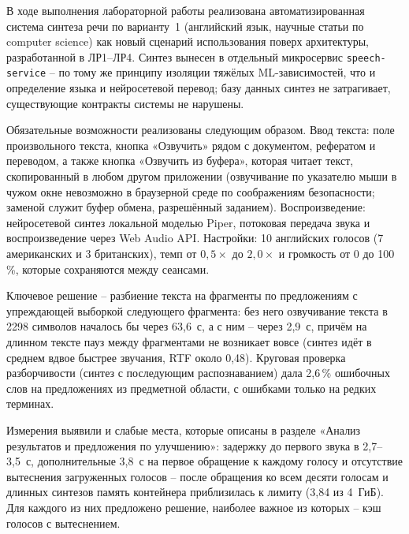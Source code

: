 

В ходе выполнения лабораторной работы реализована автоматизированная
система синтеза речи по варианту~1 (английский язык, научные статьи по
computer science) как новый сценарий использования поверх архитектуры,
разработанной в ЛР1--ЛР4. Синтез вынесен в отдельный микросервис
\texttt{speech-service} -- по тому же принципу изоляции тяжёлых
ML-зависимостей, что и определение языка и нейросетевой перевод; базу
данных синтез не затрагивает, существующие контракты системы не
нарушены.

Обязательные возможности реализованы следующим образом. Ввод текста:
поле произвольного текста, кнопка «Озвучить» рядом с документом,
рефератом и переводом, а также кнопка «Озвучить из буфера», которая
читает текст, скопированный в любом другом приложении (озвучивание по
указателю мыши в чужом окне невозможно в браузерной среде по
соображениям безопасности; заменой служит буфер обмена, разрешённый
заданием). Воспроизведение: нейросетевой синтез локальной моделью
Piper, потоковая передача звука и воспроизведение через Web Audio API.
Настройки: 10 английских голосов (7 американских и 3 британских),
темп от $0{,}5\times$ до $2{,}0\times$ и громкость от 0 до 100\,\%,
которые сохраняются между сеансами.

Ключевое решение -- разбиение текста на фрагменты по предложениям с
упреждающей выборкой следующего фрагмента: без него озвучивание текста
в 2298 символов началось бы через 63{,}6~с, а с ним -- через 2{,}9~с,
причём на длинном тексте пауз между фрагментами не возникает вовсе
(синтез идёт в среднем вдвое быстрее звучания, RTF около 0{,}48).
Круговая проверка разборчивости (синтез с последующим распознаванием)
дала 2{,}6\,\% ошибочных слов на предложениях из предметной области,
с ошибками только на редких терминах.

Измерения выявили и слабые места, которые описаны в разделе «Анализ
результатов и предложения по улучшению»: задержку до первого звука в
2{,}7--3{,}5~с, дополнительные 3{,}8~с на первое обращение к каждому
голосу и отсутствие вытеснения загруженных голосов -- после обращения ко
всем десяти голосам и длинных синтезов память контейнера приблизилась
к лимиту (3{,}84 из 4~ГиБ). Для каждого из них предложено
решение, наиболее важное из которых -- кэш голосов с вытеснением.
